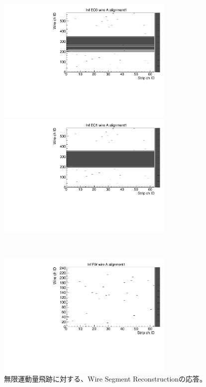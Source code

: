   \begin{figure}
      \begin{minipage}[b]{.5\linewidth}
          \centering
          \includegraphics[height=6cm]{fig/Test/B_InfEC0_wire.pdf}
      \end{minipage}
      \begin{minipage}[b]{.5\linewidth}
          \centering
          \includegraphics[height=6cm]{fig/Test/B_InfEC1_wire.pdf}
      \end{minipage}\\
      \begin{minipage}[b]{\linewidth}
          \centering
          \includegraphics[height=6cm]{fig/Test/B_InfFW_wire.pdf}
      \end{minipage}
      \caption[異なる画像形式の比較]{無限運動量飛跡に対する、Wire Segment Reconstructionの応答。}
      \label{Inf_B_Wire}
  \end{figure}
  
